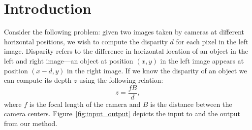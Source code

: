 \documentclass[twoside,11pt]{article}
\begin{document}
\section{Introduction}
Consider the following problem: given two images taken by cameras at
different horizontal positions, we wish to compute the disparity $d$ for each
pixel in the left image. Disparity refers to the difference in horizontal
location of an object in the left and right image---an object at position $(x,
y)$ in the left image appears at position $(x - d, y)$ in the right image. If
we know the disparity of an object we can compute its depth $z$ using the
following relation:
%
\begin{equation*}
z = \frac{f B}{d},
\end{equation*}
%
where $f$ is the focal length of the camera and $B$ is the distance between the
camera centers. Figure~\ref{fig:input_output} depicts the input to and the
output from our method. 
\end{document}
